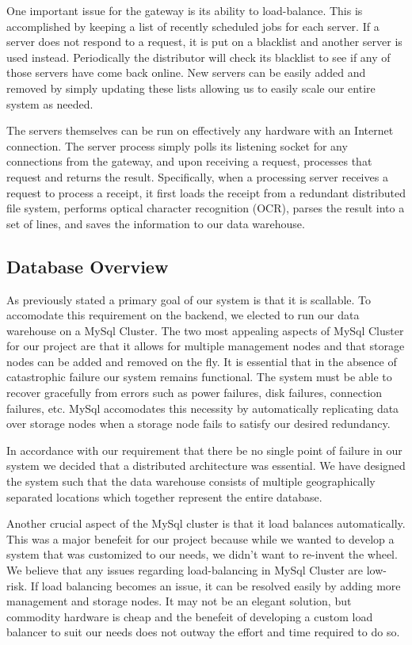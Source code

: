One important issue for the gateway is its ability to
load-balance. This is accomplished by keeping a list of recently
scheduled jobs for each server. If a server does not respond to a
request, it is put on a blacklist and another server is used
instead. Periodically the distributor will check its blacklist to see
if any of those servers have come back online. New servers can be
easily added and removed by simply updating these lists allowing us to
easily scale our entire system as needed.

The servers themselves can be run on effectively any hardware with an
Internet connection. The server process simply polls its listening
socket for any connections from the gateway, and upon receiving a
request, processes that request and returns the result. Specifically,
when a processing server receives a request to process a receipt, it
first loads the receipt from a redundant distributed file system,
performs optical character recognition (OCR), parses the result into a
set of lines, and saves the information to our data warehouse.

\subsection{Database Overview}
\label{sec:overview.db}

As previously stated a primary goal of our system is that it is scallable.  To accomodate this requirement on the backend, we elected to run our data warehouse on a MySql Cluster.  The two most appealing aspects of MySql Cluster for our project are that it allows for multiple management nodes and that storage nodes can be added and removed on the fly.  It is essential that in the absence of catastrophic failure our system remains functional.  The system must be able to recover gracefully from errors such as power failures, disk failures, connection failures, etc.  MySql accomodates this necessity by automatically replicating data over storage nodes when a storage node fails to satisfy our desired redundancy.

In accordance with our requirement that there be no single point of failure in our system we decided that a distributed architecture was essential.  We have designed the system such that the data warehouse consists of multiple geographically separated locations which together represent the entire database.

Another crucial aspect of the MySql cluster is that it load balances automatically.  This was a major benefeit for our project because while we wanted to develop a system that was customized to our needs, we didn't want to re-invent the wheel.  We believe that any issues regarding load-balancing in MySql Cluster are low-risk.  If load balancing becomes an issue, it can be resolved easily by adding more management and storage nodes.  It may not be an elegant solution, but commodity hardware is cheap and the benefeit of developing a custom load balancer to suit our needs does not outway the effort and time required to do so.
